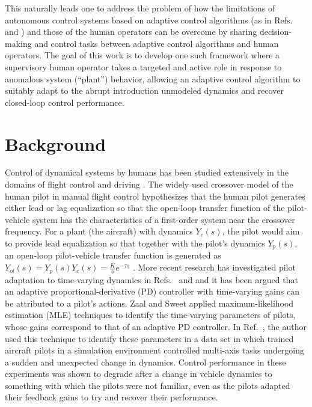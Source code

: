 This naturally leads one to address the problem of how the limitations of autonomous control systems based on adaptive control algorithms (as in Refs.~\cite{narendra2012stable} and \cite{lavretsky2013robust}) and those of the human operators can be overcome by sharing decision-making and control tasks between adaptive control algorithms and human operators. The goal of this work is to develop one such framework where a supervisory human operator takes a targeted and active role in response to anomalous system (``plant'') behavior, allowing an adaptive control algorithm to suitably adapt to the abrupt introduction unmodeled dynamics and recover closed-loop control performance.  

\section{Background}
Control of dynamical systems by humans has been studied extensively in the domains of flight control \cite{hess2015modeling, zaal2016manual, mcruer1967review} and driving \cite{macadam2003understanding}. The widely used crossover model of the human pilot in manual flight control \cite{mcruer1967review} hypothesizes that the human pilot generates either lead or lag equalization so that the open-loop transfer function of the pilot-vehicle system has the characteristics of a first-order system near the crossover frequency. For a plant (the aircraft) with dynamics $Y_c(s)$, the pilot would aim to provide lead equalization so that together with the pilot's dynamics $Y_p(s)$, an open-loop pilot-vehicle transfer function is generated as $Y_{ol}(s)  = Y_p(s)Y_c(s) = \frac{K}{s} e^{-\tau s}$ \cite{mcruer1980human}. More recent research has investigated pilot adaptation to time-varying dynamics in Refs.~\cite{hess2015modeling} and \cite{hess2009modeling} and it has been argued that an adaptive proportional-derivative (PD) controller with time-varying gains can be attributed to a pilot's actions. Zaal and Sweet \cite{zaal2011estimation} applied maximum-likelihood estimation (MLE) techniques to identify the time-varying parameters of pilots, whose gains correspond to that of an adaptive PD controller. In  Ref.~\cite{zaal2016manual}, the author used this technique to identify these parameters in a data set in which trained aircraft pilots in a simulation environment controlled multi-axis tasks undergoing a sudden and unexpected change in dynamics. Control performance in these experiments was shown to degrade after a change in vehicle dynamics to something with which the pilots were not familiar, even as the pilots adapted their feedback gains to try and recover their performance.

